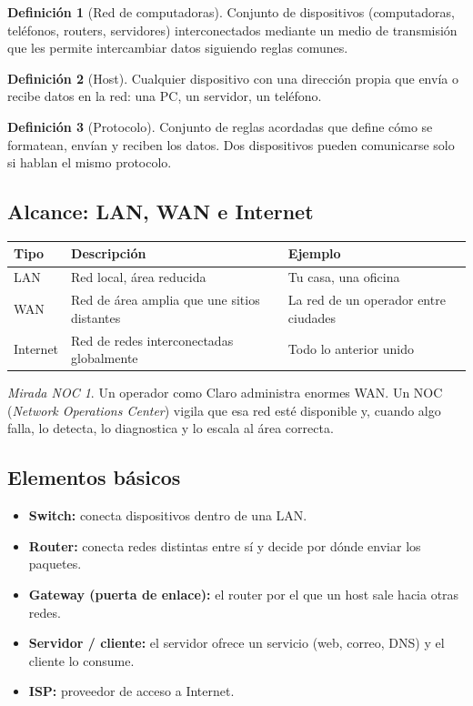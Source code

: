 \documentclass[11pt,a4paper]{article}
\theoremstyle{definition}
\newtheorem{definicion}{Definición}[section]
\theoremstyle{remark}
\newtheorem{noc}{Mirada NOC}[section]
\begin{document}
\begin{definicion}[Red de computadoras]
Conjunto de dispositivos (computadoras, teléfonos, routers, servidores) interconectados mediante un medio de transmisión que les permite intercambiar datos siguiendo reglas comunes.
\end{definicion}

\begin{definicion}[Host]
Cualquier dispositivo con una dirección propia que envía o recibe datos en la red: una PC, un servidor, un teléfono.
\end{definicion}

\begin{definicion}[Protocolo]
Conjunto de reglas acordadas que define cómo se formatean, envían y reciben los datos. Dos dispositivos pueden comunicarse solo si hablan el mismo protocolo.
\end{definicion}

\subsection{Alcance: LAN, WAN e Internet}

\begin{center}
\begin{tabular}{@{}lp{5.5cm}p{4.5cm}@{}}
\toprule
\textbf{Tipo} & \textbf{Descripción} & \textbf{Ejemplo}\\
\midrule
LAN & Red local, área reducida & Tu casa, una oficina\\
WAN & Red de área amplia que une sitios distantes & La red de un operador entre ciudades\\
Internet & Red de redes interconectadas globalmente & Todo lo anterior unido\\
\bottomrule
\end{tabular}
\end{center}

\begin{noc}
Un operador como Claro administra enormes WAN. Un NOC (\textit{Network Operations Center}) vigila que esa red esté disponible y, cuando algo falla, lo detecta, lo diagnostica y lo escala al área correcta.
\end{noc}

\subsection{Elementos básicos}

\begin{itemize}
  \item \textbf{Switch:} conecta dispositivos dentro de una LAN.
  \item \textbf{Router:} conecta redes distintas entre sí y decide por dónde enviar los paquetes.
  \item \textbf{Gateway (puerta de enlace):} el router por el que un host sale hacia otras redes.
  \item \textbf{Servidor / cliente:} el servidor ofrece un servicio (web, correo, DNS) y el cliente lo consume.
  \item \textbf{ISP:} proveedor de acceso a Internet.
\end{itemize}
\end{document}
